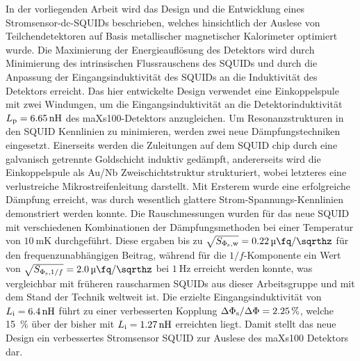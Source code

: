 \noindent
In der vorliegenden Arbeit wird das Design und die Entwicklung eines Stromsensor-dc-SQUIDs beschrieben, welches hinsichtlich der Auslese von Teilchendetektoren auf Basis metallischer magnetischer Kalorimeter optimiert wurde. Die Maximierung der Energieauflösung des Detektors wird durch Minimierung des intrinsischen Flussrauschens des SQUIDs und durch die Anpassung der Eingangsinduktivität des SQUIDs an die Induktivität des Detektors erreicht. 
Das hier entwickelte Design verwendet eine Einkoppelspule mit zwei Windungen, um die Eingangsinduktivität an die Detektorinduktivität $L_{\rm p}=\qty{6.65}{\nH}$ des maXs100-Detektors anzugleichen.
Um Resonanzstrukturen in den SQUID Kennlinien zu minimieren, werden zwei neue Dämpfungstechniken eingesetzt. Einerseits werden die Zuleitungen auf dem SQUID chip durch eine galvanisch getrennte Goldschicht induktiv gedämpft, andererseits wird die Einkoppelspule als Au/Nb Zweischichtstruktur strukturiert, wobei letzteres eine verlustreiche Mikrostreifenleitung darstellt. Mit Ersterem wurde eine erfolgreiche Dämpfung erreicht, was durch wesentlich glattere Strom-Spannungs-Kennlinien demonstriert werden konnte. Die Rauschmessungen wurden für das neue SQUID mit verschiedenen Kombinationen der Dämpfungsmethoden bei einer Temperatur von $\qty{10}{\milli\kelvin}$ durchgeführt. 
Diese ergaben bis zu $\sqrt{S_{\Phi_{\rm s}, \rm w}}=\qty{0.22}{\micro\fq\per\sqrthz}$ für den frequenzunabhängigen Beitrag, während für die $1/f$-Komponente ein Wert von $\sqrt{S_{\Phi_{\rm s}, 1/f}}=\qty{2.0}{\micro\fq\per\sqrthz}$ bei $\qty{1}{\Hz}$ erreicht werden konnte, was vergleichbar mit früheren rauscharmen SQUIDs aus dieser Arbeitsgruppe und mit dem Stand der Technik weltweit ist. Die erzielte Eingangsinduktivität von $L_{\rm i}=\qty{6.4}{\nH}$ führt zu einer verbesserten Kopplung $\Delta\Phi_{\rm s}/\Delta\Phi=\qty{2.25}{\percent}$, welche \qty{15}{\percent} über der bisher mit $L_{\rm i}=\qty{1.27}{\nH}$ erreichten liegt. Damit stellt das neue Design ein verbessertes Stromsensor SQUID zur Auslese des maXs100 Detektors dar. 





